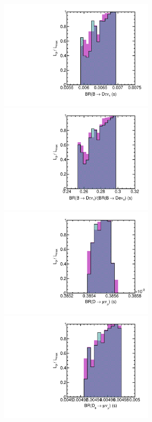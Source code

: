 \begin{figure}[htbp]
\begin{center}
\includegraphics[height=5.5cm]{figs/fig_BDtaunu_s.pdf} 
\includegraphics[height=5.5cm]{figs/fig_BDtaunu_BDenu_s.pdf} \\
\includegraphics[height=5.5cm]{figs/fig_Dmunu_s.pdf} 
\includegraphics[height=5.5cm]{figs/fig_Dsmunu_s.pdf} \\

\end{center}
\end{figure}
